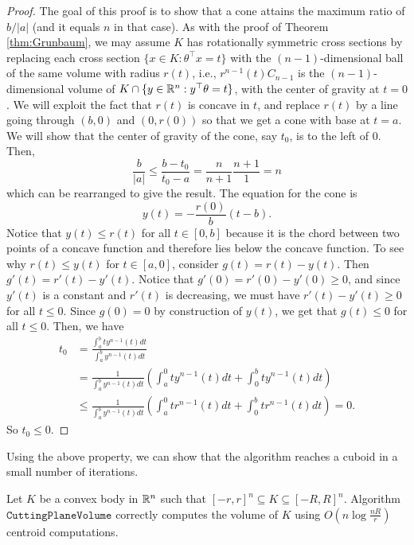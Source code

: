 \begin{proof}
The goal of this proof is to show that a cone attains the maximum
ratio of $b/|a|$ (and it equals $n$ in that case). As with the proof
of Theorem \ref{thm:Grunbaum}, we may assume $K$ has rotationally
symmetric cross sections by replacing each cross section $\{x\in K\colon\theta^{\top}x=t\}$
with the $(n-1)$-dimensional ball of the same volume with radius
$r(t)$, i.e., $r^{n-1}(t)C_{n-1}$ is the $(n-1)$-dimensional volume
of $K\cap\{y\in\mathbb{R}^{n}:y^{\top}\theta=t\}$, with the center of gravity
at $t=0$. We will exploit the fact that $r(t)$ is concave in $t$,
and replace $r(t)$ by a line going through $(b,0)$ and $(0,r(0))$
so that we get a cone with base at $t=a$. We will show that the center
of gravity of the cone, say $t_{0}$, is to the left of $0$. Then,
\[
\frac{b}{|a|}\le\frac{b-t_{0}}{t_{0}-a}=\frac{n}{n+1}\frac{n+1}{1}=n
\]
which can be rearranged to give the result. The equation for the cone
is
\[
y(t)=-\frac{r(0)}{b}(t-b).
\]
Notice that $y(t)\le r(t)$ for all $t\in[0,b]$ because it is the
chord between two points of a concave function and therefore lies
below the concave function. To see why $r(t)\le y(t)$ for $t\in[a,0]$,
consider $g(t)=r(t)-y(t)$. Then $g'(t)=r'(t)-y'(t)$. Notice that
$g'(0)=r'(0)-y'(0)\ge0$, and since $y'(t)$ is a constant and $r'(t)$
is decreasing, we must have $r'(t)-y'(t)\ge0$ for all $t\le0$. Since
$g(0)=0$ by construction of $y(t)$, we get that $g(t)\le0$ for
all $t\le0$. Then, we have
\begin{align*}
t_{0} & =\frac{\int^{b}_{a}ty^{n-1}(t)dt}{\int^{b}_{a}y^{n-1}(t)dt}\\
 & =\frac{1}{\int^{b}_{a}y^{n-1}(t)dt}\left(\int^{0}_{a}ty^{n-1}(t)dt+\int^{b}_{0}ty^{n-1}(t)dt\right)\\
 & \le\frac{1}{\int^{b}_{a}y^{n-1}(t)dt}\left(\int^{0}_{a}tr^{n-1}(t)dt+\int^{b}_{0}tr^{n-1}(t)dt\right)=0.
\end{align*}
So $t_{0}\le0$.
\end{proof}
Using the above property, we can show that the algorithm reaches a
cuboid in a small number of iterations.
\begin{thm}
Let $K$ be a convex body in $\mathbb{R}^{n}$ such that $[-r,r]^{n}\subseteq K\subseteq[-R,R]^{n}$.
Algorithm $\mathtt{CuttingPlaneVolume}$ correctly computes the volume
of $K$ using $O(n\log\frac{nR}{r})$ centroid computations.
\end{thm}

